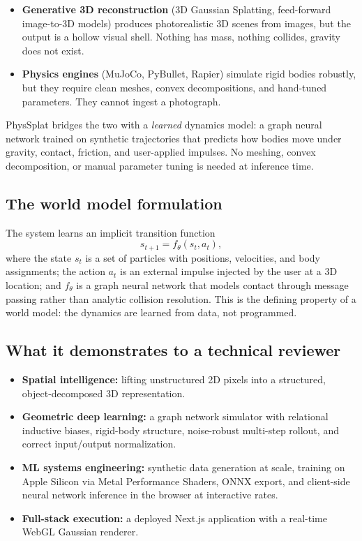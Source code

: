 \documentclass[11pt]{article}
\begin{document}
\begin{itemize}[itemsep=2pt]
  \item \textbf{Generative 3D reconstruction} (3D Gaussian Splatting, feed-forward image-to-3D models) produces photorealistic 3D scenes from images, but the output is a hollow visual shell. Nothing has mass, nothing collides, gravity does not exist.
  \item \textbf{Physics engines} (MuJoCo, PyBullet, Rapier) simulate rigid bodies robustly, but they require clean meshes, convex decompositions, and hand-tuned parameters. They cannot ingest a photograph.
\end{itemize}

PhysSplat bridges the two with a \emph{learned} dynamics model: a graph neural network trained on synthetic trajectories that predicts how bodies move under gravity, contact, friction, and user-applied impulses. No meshing, convex decomposition, or manual parameter tuning is needed at inference time.

\subsection{The world model formulation}
The system learns an implicit transition function
\begin{equation}
  s_{t+1} = f_\theta(s_t, a_t),
\end{equation}
where the state $s_t$ is a set of particles with positions, velocities, and body assignments; the action $a_t$ is an external impulse injected by the user at a 3D location; and $f_\theta$ is a graph neural network that models contact through message passing rather than analytic collision resolution. This is the defining property of a world model: the dynamics are learned from data, not programmed.

\subsection{What it demonstrates to a technical reviewer}
\begin{itemize}[itemsep=2pt]
  \item \textbf{Spatial intelligence:} lifting unstructured 2D pixels into a structured, object-decomposed 3D representation.
  \item \textbf{Geometric deep learning:} a graph network simulator with relational inductive biases, rigid-body structure, noise-robust multi-step rollout, and correct input/output normalization.
  \item \textbf{ML systems engineering:} synthetic data generation at scale, training on Apple Silicon via Metal Performance Shaders, ONNX export, and client-side neural network inference in the browser at interactive rates.
  \item \textbf{Full-stack execution:} a deployed Next.js application with a real-time WebGL Gaussian renderer.
\end{itemize}
\end{document}
